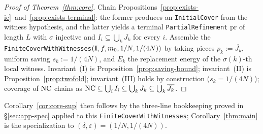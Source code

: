 \begin{proof}[Proof of Theorem~\ref{thm:core}]
Chain Propositions~\ref{prop:exists-ic}~and~\ref{prop:exists-terminal}:
the former produces an \texttt{InitialCover} from the witness
hypothesis, and the latter yields a terminal
\texttt{PartialRefinement} $\mathrm{pr}$ of length $L$ with
$\sigma$ injective and $I_i \subseteq \bigcup_k J_k$ for every
$i$. Assemble the
\texttt{FiniteCoverWithWitnesses}$(\mathbf{I}, f, m_0, 1/N, 1/(4N))$
by taking pieces $p_k := \overline{J_k}$, uniform saving
$s_k := 1/(4N)$, and $E_k$ the replacement energy of the
$\sigma(k)$-th local witness. Invariant~(I) is
Proposition~\ref{prop:saving-bound}; invariant~(II) is
Proposition~\ref{prop:twofold}; invariant~(III) holds by
construction ($s_k = 1/(4N)$); coverage of $\mathrm{NC}$ chains as
$\mathrm{NC} \subseteq \bigcup_i I_i \subseteq \bigcup_k J_k \subseteq
\bigcup_k \overline{J_k}$.
\end{proof}

Corollary~\ref{cor:core-sup} then follows by the three-line
bookkeeping proved in \S\ref{sec:app-spec} applied to this
\texttt{FiniteCoverWithWitnesses}; Corollary~\ref{thm:main} is
the specialization to $(\delta, \varepsilon) = (1/N, 1/(4N))$.

